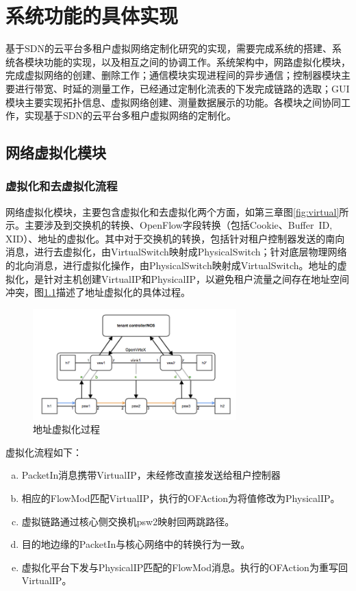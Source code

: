 \chapter{系统功能的具体实现}
基于SDN的云平台多租户虚拟网络定制化研究的实现，需要完成系统的搭建、系统各模块功能的实现，以及相互之间的协调工作。系统架构中，网路虚拟化模块，完成虚拟网络的创建、删除工作；通信模块实现进程间的异步通信；控制器模块主要进行带宽、时延的测量工作，已经通过定制化流表的下发完成链路的选取；GUI模块主要实现拓扑信息、虚拟网络创建、测量数据展示的功能。各模块之间协同工作，实现基于SDN的云平台多租户虚拟网络的定制化。
\section{网络虚拟化模块}
\subsection{虚拟化和去虚拟化流程}
网络虚拟化模块，主要包含虚拟化和去虚拟化两个方面，如第三章图\ref{fig:virtual}所示。主要涉及到交换机的转换、OpenFlow字段转换（包括Cookie、Buffer\ ID, XID）、地址的虚拟化。其中对于交换机的转换，包括针对租户控制器发送的南向消息，进行去虚拟化，由VirtualSwitch映射成PhysicalSwitch；针对底层物理网络的北向消息，进行虚拟化操作，由PhysicalSwitch映射成VirtualSwitch。地址的虚拟化，是针对主机创建VirtualIP和PhysicalIP，以避免租户流量之间存在地址空间冲突，图\ref{fig:addr-vir}描述了地址虚拟化的具体过程。

\begin{figure}[!htb]
  \centering
  \includegraphics[width=0.7\textwidth]{logo/addr_virt.png}
  \caption{地址虚拟化过程}
  \label{fig:addr-vir}
\end{figure}

虚拟化流程如下：
\begin{enumerate}[a)]
\item PacketIn消息携带VirtualIP，未经修改直接发送给租户控制器
\item 相应的FlowMod匹配VirtualIP，执行的OFAction为将值修改为PhysicalIP。
\item 虚拟链路通过核心侧交换机psw2映射回两跳路径。
\item 目的地边缘的PacketIn与核心网络中的转换行为一致。
\item 虚拟化平台下发与PhysicalIP匹配的FlowMod消息。执行的OFAction为重写回VirtualIP。
\end{enumerate}

